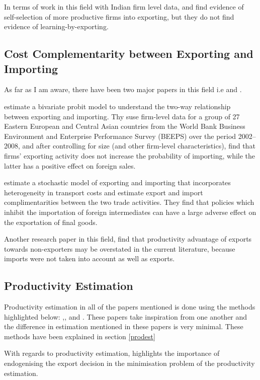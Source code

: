 \documentclass[11pt]{article}
\begin{document}
In terms of work in this field with Indian firm level  data,
\cite{haidar2012trade} and \cite{gupta2018exporting} find evidence of
self-selection of more productive firms into exporting, but they do
not find evidence of learning-by-exporting.  
\subsection{Cost Complementarity between Exporting and Importing}
As far as I am aware, there have been two major papers in this field
i.e \cite{aristei2013firms} and \cite{kasahara2013productivity}. 

\cite{aristei2013firms} estimate a bivariate probit model to
understand the two-way relationship between exporting and importing. 
Thy suse  firm-level data for a group of 27 Eastern European and 
Central Asian countries from the World Bank Business Environment 
and Enterprise Performance Survey (BEEPS) over the period 2002–2008, 
and after controlling for size (and other firm-level characteristics),
find that firms’ exporting activity does not increase the
probability of importing, while the latter has a positive effect
 on foreign sales. 

\cite{kasahara2013productivity} estimate a stochastic model of
exporting and importing that incorporates heterogeneity in transport
costs and estimate export and import complimentarities between the two
trade activities. They find that policies which inhibit the
importation of  foreign intermediates can have a large adverse 
effect on the exportation of final goods.  

Another research paper in this field, \cite{muuls2009imports} find
that productivity advantage of exports towards non-exporters
may be overstated in the current literature, 
because imports were not taken into account as well as exports.
\subsection{Productivity Estimation}
Productivity estimation in all of the papers mentioned is done using
the methods highlighted  below:
\cite{olley1992dynamics},\cite{levinsohn2003estimating},
\cite{ackerberg2006structural} and \cite{wooldridge2009estimating}. 
These papers take inspiration from one another and the difference in
estimation mentioned in these papers is very minimal. These methods
have been explained in section \ref{prodest}

With regards to productivity estimation, \cite{de2013detecting} highlights the importance of endogenising
the export decision in the minimisation problem of the productivity
estimation. 
\end{document}
